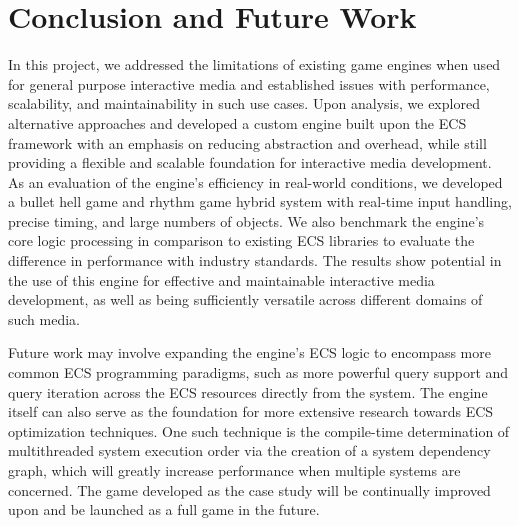 \section{Conclusion and Future Work}
\label{sec:conclusion-and-future-work}

In this project, we addressed the limitations of existing game engines when used for general purpose interactive media
and established issues with performance, scalability, and maintainability in such use cases.
Upon analysis, we explored alternative approaches and developed a custom engine built upon the ECS framework with an
emphasis on reducing abstraction and overhead, while still providing a flexible and scalable foundation for interactive
media development.
As an evaluation of the engine's efficiency in real-world conditions, we developed a bullet hell game and rhythm game
hybrid system with real-time input handling, precise timing, and large numbers of objects.
We also benchmark the engine's core logic processing in comparison to existing ECS libraries to evaluate the difference
in performance with industry standards.
The results show potential in the use of this engine for effective and maintainable interactive media development, as well
as being sufficiently versatile across different domains of such media.

Future work may involve expanding the engine's ECS logic to encompass more common ECS programming paradigms, such as
more powerful query support and query iteration across the ECS resources directly from the system.
The engine itself can also serve as the foundation for more extensive research towards ECS optimization techniques.
One such technique is the compile-time determination of multithreaded system execution order via the creation of
a system dependency graph, which will greatly increase performance when multiple systems are concerned.
The game developed as the case study will be continually improved upon and be launched as a full game in the future.

\label{tag:end}